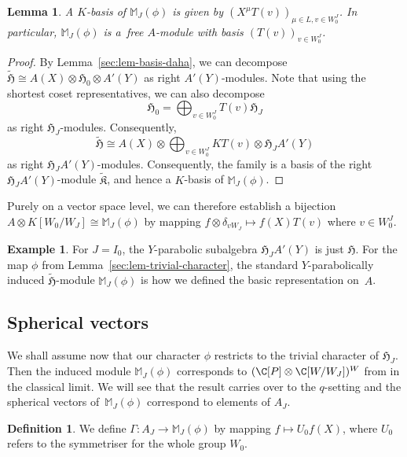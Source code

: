 \documentclass[10pt,a4paper]{amsart}
\newtheorem{Lemma}[Theorem]{Lemma}
\theoremstyle{definition}
\newtheorem{Definition}[Theorem]{Definition}
\newtheorem{Example}[Theorem]{Example}
\numberwithin{equation}{section}
\begin{document}
\begin{Lemma}\label{sec:lem-induced-module-basis}
 A $K$-basis of $\mathbb{M}_J(\phi)$ is given by
$
 (X^\mu T(v))_{\mu\in L, v\in W_0^J}$.
 In particular, $\mathbb{M}_J(\phi)$ is a~free $A$-module
 with basis $(T(v))_{v\in W_0^J}$.
\end{Lemma}
\begin{proof}
 By Lemma~\ref{sec:lem-basis-daha}, we can decompose
$\tilde{\mathfrak{H}} \cong A(X)\otimes\mathfrak{H}_0\otimes A'(Y)$
 as right $A'(Y)$-modules. Note that using the shortest coset representatives,
 we can also decompose
 \[
 \mathfrak{H}_0 = \bigoplus_{v\in W_0^J} T(v) \mathfrak{H}_J
 \]
 as right $\mathfrak{H}_J$-modules. Consequently,
 \[
 \tilde{\mathfrak{H}} \cong A(X)\otimes \bigoplus_{v\in W_0^J} KT(v)\otimes \mathfrak{H}_J A'(Y)
 \]
 as right $\mathfrak{H}_J A'(Y)$-modules. Consequently,
 the family  is a basis of the
 right $\mathfrak{H}_J A'(Y)$-module $\tilde{\mathfrak{K}}$, and hence a
 $K$-basis of $\mathbb{M}_J(\phi)$.
\end{proof}

Purely on a vector space level, we can therefore establish
a bijection $A\otimes K[W_0/W_J]\cong \mathbb{M}_J(\phi)$ by mapping
$f\otimes \delta_{vW_J}\mapsto f(X)T(v)$ where $v\in W_0^J$.

\begin{Example}
 For $J=I_0$, the $Y$-parabolic subalgebra $\mathfrak{H}_JA'(Y)$ is just
 $\mathfrak{H}$. For the map $\phi$ from
 Lemma~\ref{sec:lem-trivial-character}, the standard $Y$-parabolically
 induced $\tilde{\mathfrak{H}}$-module $\mathbb{M}_J(\phi)$ is how we
 defined the basic representation on~$A$.
\end{Example}

\subsection{Spherical vectors}\label{sec:spherical-vec}
We shall assume now that our character $\phi$ restricts to the
trivial character of $\mathfrak{H}_J$. Then the induced module
$\mathbb{M}_J(\phi)$ corresponds to $(\C[P]\otimes\C[W/W_J])^W$ from
\cite{mvpVectorValued} in the classical limit. We will see that the result \cite[Lemma~5.1]{mvpVectorValued} carries over to the $q$-setting and the spherical vectors
of~$\mathbb{M}_J(\phi)$
correspond to elements of $A_J$.

\begin{Definition}
 We define $\Gamma\colon A_J\to \mathbb{M}_J(\phi)$ by mapping
$ f \mapsto U_0 f(X)$,
 where $U_0$ refers to the symmetriser for the whole group $W_0$.
\end{Definition}
\end{document}
